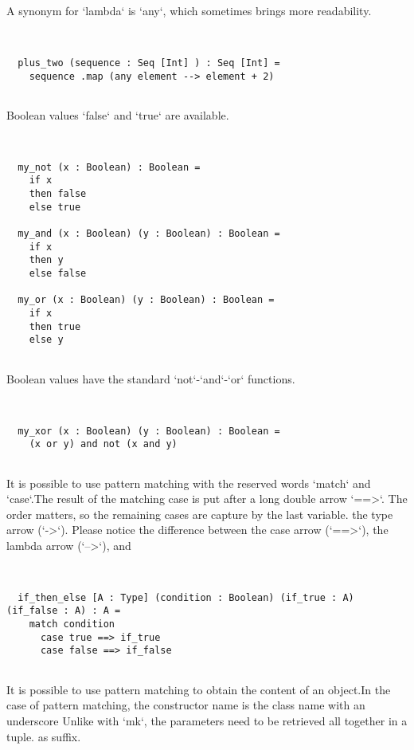 \documentclass[12pt,a4paper]{article}
\begin{document}
A synonym for `lambda` is `any`, which sometimes brings more readability. 


\begin{lstlisting}


  plus_two (sequence : Seq [Int] ) : Seq [Int] =
    sequence .map (any element --> element + 2)


\end{lstlisting}

Boolean values `false` and `true` are available. 


\begin{lstlisting}


  my_not (x : Boolean) : Boolean =
    if x
    then false
    else true

  my_and (x : Boolean) (y : Boolean) : Boolean =
    if x
    then y
    else false

  my_or (x : Boolean) (y : Boolean) : Boolean =
    if x
    then true
    else y


\end{lstlisting}

Boolean values have the standard `not`-`and`-`or` functions. 


\begin{lstlisting}


  my_xor (x : Boolean) (y : Boolean) : Boolean =
    (x or y) and not (x and y)


\end{lstlisting}

It is possible to use pattern matching with the reserved words `match` and `case`.The result of the matching case is put after a long double arrow `==>`.
The order matters, so the remaining cases are capture by the last variable.
the type arrow (`->`). Please notice the difference between the case arrow (`==>`), the lambda arrow (`-->`), and


\begin{lstlisting}


  if_then_else [A : Type] (condition : Boolean) (if_true : A) (if_false : A) : A =
    match condition
      case true ==> if_true
      case false ==> if_false


\end{lstlisting}

It is possible to use pattern matching to obtain the content of an object.In the case of pattern matching, the constructor name is the class name with an underscore
Unlike with `mk`, the parameters need to be retrieved all together in a tuple. as suffix.
\end{document}
